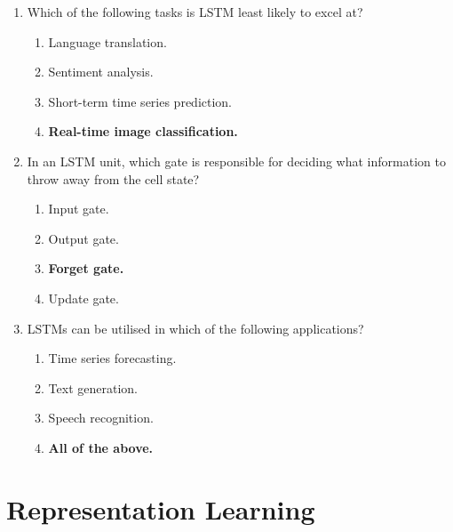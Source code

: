 \documentclass{report}
\numberwithin{equation}{section}
\begin{document}
\begin{enumerate}
\item Which of the following tasks is LSTM least likely to excel at?
\begin{enumerate}[label=\alph*.]
    \item Language translation.
    \item Sentiment analysis.
    \item Short-term time series prediction.
    \item \textbf{Real-time image classification.}
\end{enumerate}

\item In an LSTM unit, which gate is responsible for deciding what information to throw away from the cell state?
\begin{enumerate}[label=\alph*.]
    \item Input gate.
    \item Output gate.
    \item \textbf{Forget gate.}
    \item Update gate.
\end{enumerate}

\item LSTMs can be utilised in which of the following applications?
\begin{enumerate}[label=\alph*.]
    \item Time series forecasting.
    \item Text generation.
    \item Speech recognition.
    \item \textbf{All of the above.}
\end{enumerate}
    
\end{enumerate}

\section{Representation Learning}
\end{document}
